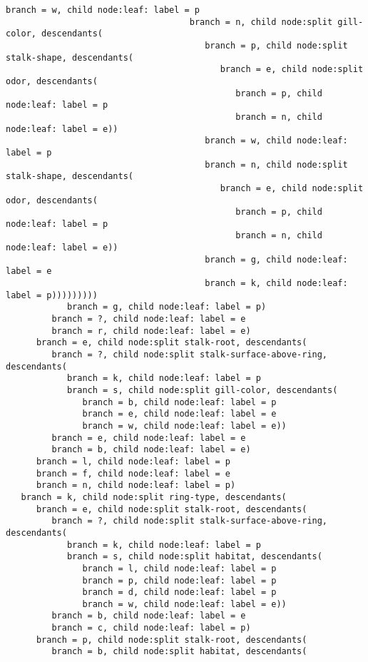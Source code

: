 \documentclass[11pt]{article}
\begin{document}
\begin{Verbatim}[commandchars=\\\{\}]
                                    branch = w, child node:leaf: label = p
                                    branch = n, child node:split gill-color, descendants(
                                       branch = p, child node:split stalk-shape, descendants(
                                          branch = e, child node:split odor, descendants(
                                             branch = p, child node:leaf: label = p
                                             branch = n, child node:leaf: label = e))
                                       branch = w, child node:leaf: label = p
                                       branch = n, child node:split stalk-shape, descendants(
                                          branch = e, child node:split odor, descendants(
                                             branch = p, child node:leaf: label = p
                                             branch = n, child node:leaf: label = e))
                                       branch = g, child node:leaf: label = e
                                       branch = k, child node:leaf: label = p)))))))))
            branch = g, child node:leaf: label = p)
         branch = ?, child node:leaf: label = e
         branch = r, child node:leaf: label = e)
      branch = e, child node:split stalk-root, descendants(
         branch = ?, child node:split stalk-surface-above-ring, descendants(
            branch = k, child node:leaf: label = p
            branch = s, child node:split gill-color, descendants(
               branch = b, child node:leaf: label = p
               branch = e, child node:leaf: label = e
               branch = w, child node:leaf: label = e))
         branch = e, child node:leaf: label = e
         branch = b, child node:leaf: label = e)
      branch = l, child node:leaf: label = p
      branch = f, child node:leaf: label = e
      branch = n, child node:leaf: label = p)
   branch = k, child node:split ring-type, descendants(
      branch = e, child node:split stalk-root, descendants(
         branch = ?, child node:split stalk-surface-above-ring, descendants(
            branch = k, child node:leaf: label = p
            branch = s, child node:split habitat, descendants(
               branch = l, child node:leaf: label = p
               branch = p, child node:leaf: label = p
               branch = d, child node:leaf: label = p
               branch = w, child node:leaf: label = e))
         branch = b, child node:leaf: label = e
         branch = c, child node:leaf: label = p)
      branch = p, child node:split stalk-root, descendants(
         branch = b, child node:split habitat, descendants(

\end{Verbatim}
\end{document}
